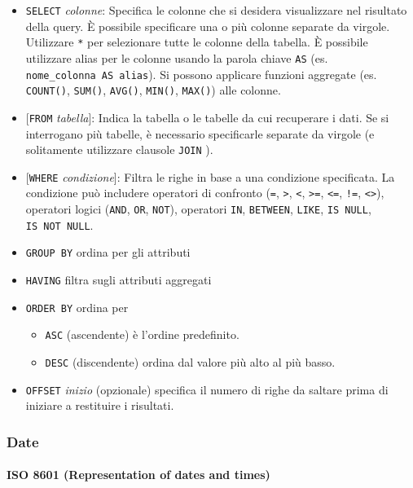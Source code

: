 \documentclass[italian,a4paper]{article}
\providecommand{\tightlist}{%
  \setlength{\itemsep}{0pt}\setlength{\parskip}{0pt}}
\begin{document}
\begin{itemize}
\tightlist
\item
  \texttt{SELECT} \emph{colonne}: Specifica le colonne che si desidera
  visualizzare nel risultato della query. È possibile specificare una o
  più colonne separate da virgole. Utilizzare \texttt{*} per selezionare
  tutte le colonne della tabella. È possibile utilizzare alias per le
  colonne usando la parola chiave \texttt{AS} (es.
  \texttt{nome\_colonna\ AS\ alias}). Si possono applicare funzioni
  aggregate (es. \texttt{COUNT()}, \texttt{SUM()}, \texttt{AVG()},
  \texttt{MIN()}, \texttt{MAX()}) alle colonne.
\item
  {[}\texttt{FROM} \emph{tabella}{]}: Indica la tabella o le tabelle da
  cui recuperare i dati. Se si interrogano più tabelle, è necessario
  specificarle separate da virgole (e solitamente utilizzare clausole
  \texttt{JOIN} ).
\item
  {[}\texttt{WHERE} \emph{condizione}{]}: Filtra le righe in base a una
  condizione specificata. La condizione può includere operatori di
  confronto (\texttt{=}, \texttt{\textgreater{}}, \texttt{\textless{}},
  \texttt{\textgreater{}=}, \texttt{\textless{}=}, \texttt{!=},
  \texttt{\textless{}\textgreater{}}), operatori logici (\texttt{AND},
  \texttt{OR}, \texttt{NOT}), operatori \texttt{IN}, \texttt{BETWEEN},
  \texttt{LIKE}, \texttt{IS\ NULL}, \texttt{IS\ NOT\ NULL}.
\item \texttt{GROUP BY} ordina per gli attributi
\item \texttt{HAVING} filtra sugli attributi aggregati
\item \texttt{ORDER BY} ordina per
  \begin{itemize}
  \tightlist
  \item
    \texttt{ASC} (ascendente) è l'ordine predefinito.
  \item
    \texttt{DESC} (discendente) ordina dal valore più alto al più basso.
  \end{itemize}
\item
  \texttt{OFFSET} \emph{inizio} (opzionale) specifica il numero di righe
  da saltare prima di iniziare a restituire i risultati.
\end{itemize}

\subsubsection{Date}\label{date}

\paragraph{ISO 8601 (Representation of dates and
times)}\label{iso-8601-representation-of-dates-and-times}
\end{document}
